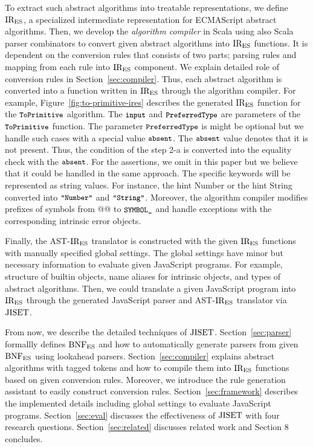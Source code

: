 To extract such abstract algorithms into treatable representations,
we define \( \text{IR}_\text{ES} \), a specialized intermediate representation
for ECMAScript abstract algorithms. Then, we develop the \textit{algorithm compiler}
in Scala using also Scala parser combinators to convert given abstract algorithms
into \( \text{IR}_\text{ES} \) functions. It is dependent on the conversion rules that consists of two parts;
parsing rules and mapping from each rule into \( \text{IR}_\text{ES} \) component.
We explain detailed role of conversion rules in Section~\ref{sec:compiler}.
Thus, each abstract algorithm is converted into a function written in \( \text{IR}_\text{ES} \)
through the algorithm compiler. For example, Figure~\ref{fig:to-primitive-ires}
describes the generated \( \text{IR}_\text{ES} \) function for the \( \texttt{\small ToPrimitive} \)
algorithm. The \( \texttt{\small input} \) and \( \texttt{\small PreferredType} \) are parameters
of the \( \texttt{\small ToPrimitive} \) function. The parameter \( \texttt{\small PreferredType} \)
is might be optional but we handle such cases with a special value \( \texttt{\small absent} \).
The \( \texttt{\small absent} \) value denotes that it is not present.
Thus, the condition of the step 2-a is converted into
the equality check with the \( \texttt{\small absent} \).
For the assertions, we omit in this paper but we believe that it could be handled in
the same approach. The specific keywords will be represented as string values.
For instance, the hint Number or the hint String converted into \( \texttt{\small"Number"} \)
and \( \texttt{\small"String"} \). Moreover, the algorithm compiler modifies prefixes of
symbols from @@ to \( \texttt{\small SYMBOL\_} \) and handle exceptions with the corresponding
intrinsic error objects.

Finally, the AST-\( \text{IR}_\text{ES} \) translator is constructed with the given \( \text{IR}_\text{ES} \)
functions with manually specified global settings. The global settings have
minor but necessary information to evaluate given JavaScript programs.
For example, structure of builtin objects, name aliases for intrinsic objects,
and types of abstract algorithms. Then, we could translate a given JavaScript program
into \( \text{IR}_\text{ES} \) through the generated JavaScript parser and AST-\( \text{IR}_\text{ES} \) translator
via \( \text{JISET} \).

From now, we describe the detailed techniques of \( \text{JISET} \).
Section~\ref{sec:parser} formallly defines \( \text{BNF}_{\text{ES}} \) and how to automatically
generate parsers from given \( \text{BNF}_{\text{ES}} \) using lookahead parsers.
Section~\ref{sec:compiler} explains abstract algorithms with tagged tokens
and how to compile them into \( \text{IR}_\text{ES} \) functions based on
given conversion rules. Moreover, we introduce the rule generation assistant
to easily construct conversion rules. Section~\ref{sec:framework} describes
the implemented details including global settings to evaluate JavaScript programs.
Section~\ref{sec:eval} discusses the effectiveness of \( \text{JISET} \) with
four research questions.
Section~\ref{sec:related} discusses related work and Section 8 concludes.
